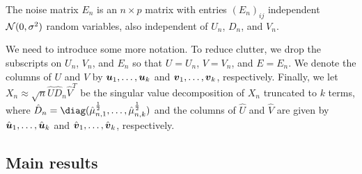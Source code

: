 \begin{assumption}\label{A:noise}
    The noise matrix $E_n$ is an $n\times p$ matrix with entries $(E_n)_{ij}$
    independent $\mathcal{N}(0,\sigma^2)$ random variables, also independent of
    $U_n$, $D_n$, and $V_n$.
\end{assumption}
\noindent

We need to introduce some more notation.  To reduce clutter, we drop the
subscripts on $U_n$, $V_n$, and $E_n$ so that $U = U_n$, $V = V_n$, and
$E = E_n$. We denote the columns of $U$ and $V$ by $\boldsymbol{u}_{1}, \ldots, \boldsymbol{u}_{k}$ and
$\boldsymbol{v}_{1}, \ldots, \boldsymbol{v}_{k}$, respectively.
Finally, we let $X_n \approx \sqrt{n} \hat U \hat D_n \hat V^T$ be the singular value
decomposition of $X_n$ truncated to $k$ terms, where 
$\hat D_n = \diag( \hat \mu_{n,1}^\half, \ldots, \hat \mu_{n,k}^\half)$ and the columns of
$\hat U$ and $\hat V$ are given by $\hat {\boldsymbol{u}}_{1}, \ldots, \hat {\boldsymbol{u}}_{k}$
and $\hat {\boldsymbol{v}}_{1}, \ldots, \hat {\boldsymbol{v}}_{k}$, respectively.


\subsection{Main results}

